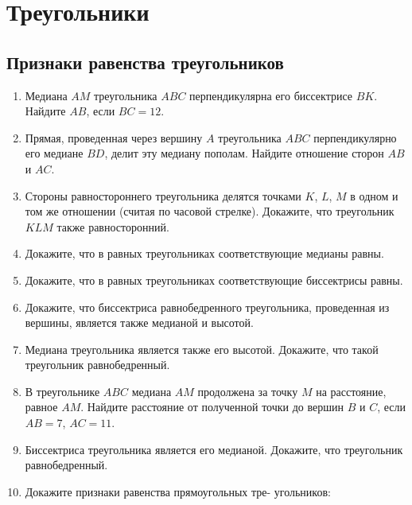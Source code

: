 \documentclass[10pt, a4paper]{article}
\begin{document}
		

\section{Треугольники}
\subsection{Признаки равенства треугольников}
	\begin{enumerate}
		\item {} Медиана $AM$ треугольника $ABC$ перпендикулярна его биссектрисе $BK$. Найдите $AB$, если $BC = 12$.
		\item {} Прямая,  проведенная  через  вершину  $A$  треугольника $ABC$ перпендикулярно его медиане $BD$, 
		делит эту медиану пополам. Найдите отношение сторон $AB$ и $AC$.
		\item {} Стороны  равностороннего  треугольника  делятся  точками $K$, $L$, $M$ в одном и том же отношении (считая по часовой стрелке).  Докажите,  что  треугольник $KLM$  также  равносторонний.
		\item {} Докажите, что в равных треугольниках соответствующие медианы равны.
		\item {} Докажите, что в равных треугольниках соответствующие биссектрисы равны.
		\item {} Докажите, что биссектриса равнобедренного треугольника, проведенная из вершины, является также медианой
		и высотой.
		\item {} Медиана треугольника является также его высотой.
		Докажите, что такой треугольник равнобедренный.
		\item {} В треугольнике $ABC$ медиана $AM$ продолжена за точку $M$ на расстояние, равное $AM$. Найдите расстояние от полученной точки до вершин $B$ и $C$, если $AB = 7$, $AC = 11$.
		\item {} Биссектриса треугольника является его медианой. Докажите, что треугольник равнобедренный.
		\item {} Докажите признаки равенства прямоугольных тре-
		угольников:
		\begin{enumerate}[label=\asbuk*)]

\end{enumerate}
\end{enumerate}
\end{document}
